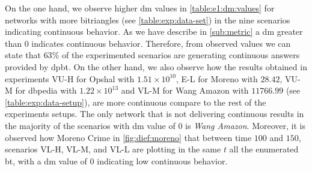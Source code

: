 On the one hand, we observe higher \acrshort{dm} values in \autoref{table:e1:dm:values} for networks with more bitriangles (see \autoref{table:exp:data-set}) in the nine scenarios indicating continuous behavior.
As we have describe in \autoref{sub:metric} a \acrshort{dm} greater than $0$ indicates continuous behavior. Therefore, from observed values we can state that $63\%$ of the experimented scenarios are generating continuous answers provided by \acrshort{dpbt}.
On the other hand, we also observe how the results obtained in experiments VU-H for Opshal with $1.51 \times 10^{10}$, E-L for Moreno with $28.42$, VU-M for dbpedia with $1.22 \times 10^{13}$ and VL-M for Wang Amazon with $11766.99$ (see \autoref{table:exp:data-setup}), are more continuous compare to the rest of the experiments setups. 
The only network that is not delivering continuous results in the majority of the scenarios with \acrshort{dm} value of $0$ is \emph{Wang Amazon}. 
Moreover, it is observed how Moreno Crime in \autoref{fig:dief:moreno} that between time $100$ and $150$, scenarios VL-H, VL-M, and VL-L are plotting in the same $t$ all the enumerated \acrshort{bt}, with a \acrshort{dm} value of $0$ indicating low continuous behavior. 

